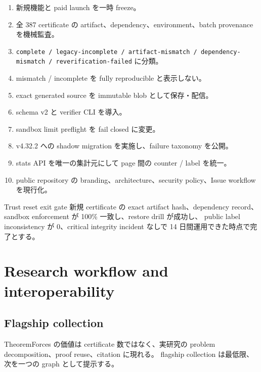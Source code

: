 \documentclass[a4paper,11pt]{ltjsarticle}
\begin{document}
\begin{enumerate}
  \item 新規機能と paid launch を一時 freeze。
  \item 全 387 certificate の artifact、dependency、environment、batch provenance を機械監査。
  \item \texttt{complete / legacy-incomplete / artifact-mismatch / dependency-mismatch / reverification-failed} に分類。
  \item mismatch / incomplete を fully reproducible と表示しない。
  \item exact generated source を immutable blob として保存・配信。
  \item schema v2 と verifier CLI を導入。
  \item sandbox limit preflight を fail closed に変更。
  \item v4.32.2 への shadow migration を実施し、failure taxonomy を公開。
  \item stats API を唯一の集計元にして page 間の counter / label を統一。
  \item public repository の branding、architecture、security policy、Issue workflow を現行化。
\end{enumerate}

\begin{decisionbox}{Trust reset exit gate}
新規 certificate の exact artifact hash、dependency record、sandbox enforcement が 100\% 一致し、restore drill が成功し、
public label inconsistency が 0、critical integrity incident なしで 14 日間運用できた時点で完了とする。
\end{decisionbox}

\section{Research workflow and interoperability}

\subsection{Flagship collection}

TheoremForces の価値は certificate 数ではなく、実研究の problem decomposition、proof reuse、citation に現れる。
flagship collection は最低限、次を一つの graph として提示する。
\end{document}
